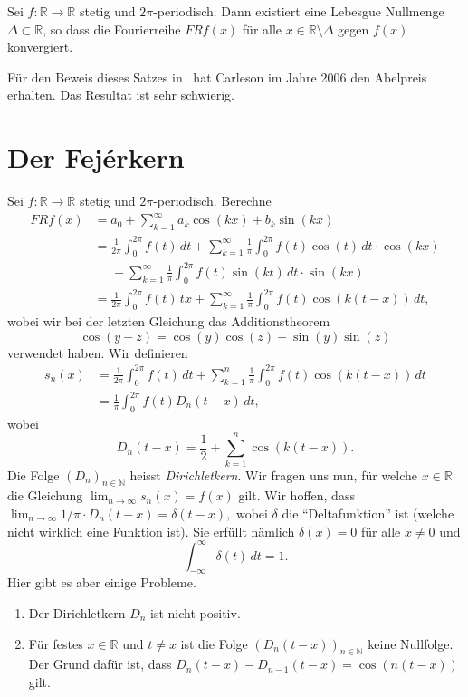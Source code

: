 \documentclass[../main.tex]{subfiles}
\begin{document}
\begin{theorem}[Carleson 1966]
   Sei $f \colon \mathbb{R} \to \mathbb{R}$ 
   stetig und $2\pi$-periodisch.
   Dann existiert eine Lebesgue Nullmenge
   $\Delta \subset \mathbb{R}$, so dass die Fourierreihe
   $FRf(x)$ für alle $x \in \mathbb{R} \setminus \Delta$ 
   gegen $f(x)$ konvergiert.
\end{theorem}

Für den Beweis dieses Satzes in~\cite{carleson}
hat Carleson im Jahre 2006 den Abelpreis erhalten.
Das Resultat ist sehr schwierig.

\section{Der Fejérkern}
Sei $f \colon \mathbb{R} \to \mathbb{R}$ stetig
und $2\pi$-periodisch.
Berechne
\begin{align*}
  FRf(x)
  & = a_0 + \sum_{k=1}^{\infty} a_k \cos(kx) + b_k \sin(kx)\\
  & = \frac{1}{2\pi} \int_{0}^{2\pi} f(t) \, dt +
  \sum_{k=1}^{\infty} \frac{1}{\pi}\int_{0}^{2\pi} 
  f(t) \cos(t) \, dt
  \cdot \cos(kx) \\
  &\;\;\;\;\; + \sum_{k=1}^{\infty} \frac{1}{\pi} \int_{0}^{2\pi} 
  f(t) \sin(kt)\, dt \cdot \sin(kx)\\
  &= \frac{1}{2\pi} \int_{0}^{2\pi} f(t) \, tx
  + \sum_{k=1}^{\infty} \frac{1}{\pi} \int_{0}^{2\pi} 
  f(t) \cos(k(t-x))\, dt,
\end{align*}
wobei wir bei der letzten Gleichung das Additionstheorem
\[
  \cos(y - z) = \cos(y) \cos(z) + \sin(y) \sin(z)
\]
verwendet haben.
Wir definieren
\begin{align*}
 s_n(x) 
 & = \frac{1}{2\pi} \int_{0}^{2\pi} f(t) \, dt
  + \sum_{k=1}^{n} \frac{1}{\pi}
  \int_{0}^{2\pi} f(t) \cos(k(t-x)) \, dt \\
 &= \frac{1}{\pi} \int_{0}^{2\pi} f(t) D_n(t - x) \, dt,
\end{align*}
wobei
\[
  D_n(t - x) = \frac{1}{2} + \sum_{k=1}^{n} \cos(k(t-x)).
\]
Die Folge ${(D_{n})}_{n \in \mathbb{N}}$ heisst
\emph{Dirichletkern}.
Wir fragen uns nun,
für welche $x \in \mathbb{R}$ die Gleichung
\(
  \lim_{n \to \infty} s_n(x) = f(x)
\)
gilt.
Wir hoffen, dass
\(
  \lim_{n \to \infty} 1/\pi \cdot D_n(t-x) = \delta(t-x),
\)
wobei $\delta$ die ``Deltafunktion'' ist (welche nicht wirklich
eine Funktion ist). Sie erfüllt nämlich $\delta(x) = 0$
für alle $x \neq 0$ und
\[
  \int_{-\infty}^{\infty} \delta(t) \, dt = 1.
\]
Hier gibt es aber einige Probleme.
\begin{enumerate}[(1)]
  \item Der Dirichletkern $D_n$ ist nicht positiv.
  \item Für festes $x \in \mathbb{R}$ und $t \neq x$ 
    ist die Folge ${(D_n(t-x))}_{n \in \mathbb{N}}$
     keine Nullfolge.
     Der Grund dafür ist, dass
     \(
       D_n(t- x) - D_{n-1}(t-x)
       = \cos(n (t-x))
     \) gilt.
\end{enumerate}
\end{document}
